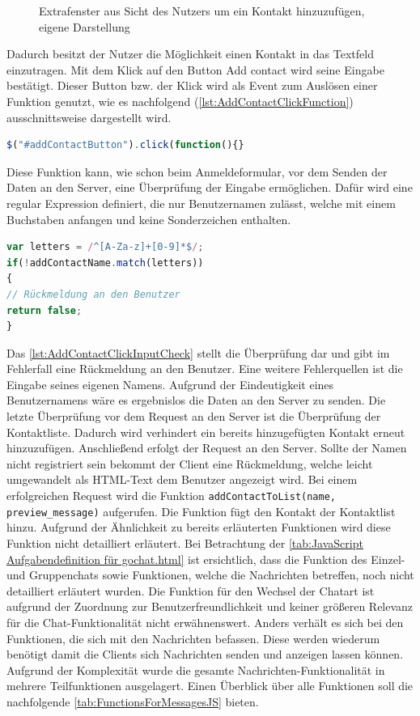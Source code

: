 \documentclass[a4paper,titlepage,halfparskip,12pt]{scrreprt}
\begin{document}
\begin{onehalfspacing}
\begin{figure}[h]
	\caption{Extrafenster aus Sicht des Nutzers um ein Kontakt hinzuzufügen, eigene Darstellung}
	\label{img:AddContactWindow}
\end{figure}
Dadurch besitzt der Nutzer die Möglichkeit einen Kontakt in das Textfeld einzutragen. Mit dem Klick auf den Button \glqq Add contact\grqq{} wird seine Eingabe bestätigt. Dieser Button bzw. der Klick wird als Event zum Auslösen einer Funktion genutzt, wie es nachfolgend (\autoref{lst:AddContactClickFunction}) ausschnittsweise dargestellt wird.
\begin{lstlisting}[language=Javascript,caption=Funktionsverknüpfung an den Kontak hinzufügen Button unter JS,label={lst:AddContactClickFunction}]
$("#addContactButton").click(function(){}
\end{lstlisting}
Diese Funktion kann, wie schon beim Anmeldeformular, vor dem Senden der Daten an den Server, eine Überprüfung der Eingabe ermöglichen. Dafür wird eine regular Expression definiert, die nur Benutzernamen zulässt, welche mit einem Buchstaben anfangen und keine Sonderzeichen enthalten.
\begin{lstlisting}[language=Javascript,caption=Überprüfung der Eingabe mittels eines regulären Ausdrucks,label={lst:AddContactClickInputCheck}]
var letters = /^[A-Za-z]+[0-9]*$/;
if(!addContactName.match(letters))
{
// Rückmeldung an den Benutzer
return false;
}
\end{lstlisting}
Das \autoref{lst:AddContactClickInputCheck} stellt die Überprüfung dar und gibt im Fehlerfall eine Rückmeldung an den Benutzer. Eine weitere Fehlerquellen ist die Eingabe seines eigenen Namens. Aufgrund der Eindeutigkeit eines Benutzernamens wäre es ergebnislos die Daten an den Server zu senden. Die letzte Überprüfung vor dem Request an den Server ist die Überprüfung der Kontaktliste. Dadurch wird verhindert ein bereits hinzugefügten Kontakt erneut hinzuzufügen. Anschließend erfolgt der Request an den Server. Sollte der Namen nicht registriert sein bekommt der Client eine Rückmeldung, welche leicht umgewandelt als \ac{HTML}-Text dem Benutzer angezeigt wird. Bei einem erfolgreichen Request wird die Funktion \texttt{addContactToList(name, preview\_message)} aufgerufen. Die Funktion fügt den Kontakt der Kontaktlist hinzu. Aufgrund der Ähnlichkeit zu bereits erläuterten Funktionen wird diese Funktion nicht detailliert erläutert. Bei Betrachtung der \autoref{tab:JavaScript Aufgabendefinition für gochat.html} ist ersichtlich, dass die Funktion des Einzel- und Gruppenchats sowie Funktionen, welche die Nachrichten betreffen, noch nicht detailliert erläutert wurden. Die Funktion für den Wechsel der Chatart ist aufgrund der Zuordnung zur Benutzerfreundlichkeit und keiner größeren Relevanz für die Chat-Funktionalität nicht erwähnenswert. Anders verhält es sich bei den Funktionen, die sich mit den Nachrichten befassen. Diese werden wiederum benötigt damit die Clients sich Nachrichten senden und anzeigen lassen können. Aufgrund der Komplexität wurde die gesamte Nachrichten-Funktionalität in mehrere Teilfunktionen ausgelagert. Einen Überblick über alle Funktionen soll die nachfolgende \autoref{tab:FunctionsForMessagesJS} bieten.

\end{onehalfspacing}
\end{document}

